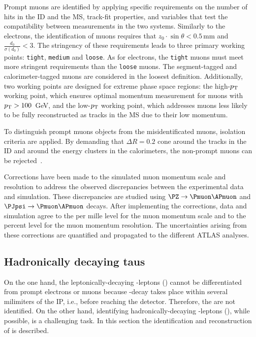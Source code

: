 Prompt muons are identified by applying specific requirements on the number of hits in the ID 
and the MS, track-fit properties, and variables that test the compatibility between measurements 
in the two systems. 
Similarly to the electrons, 
the identification of muons requires that $z_{0} \cdot \sin\theta < 0.5\,$mm and 
$\frac{d_{0}}{\sigma(d_{0})} < 3$. 
The stringency of these requirements leads to three primary working points:
\texttt{tight}, \texttt{medium} and \texttt{loose}. As for electrons, the \texttt{tight} muons must meet 
more stringent requirements than the \texttt{loose} muons. 
The segment-tagged and calorimeter-tagged muons are considered in the loosest definition.
Additionally, two working points are designed for extreme phase space regions: the high-$p_{\text{T}}$ 
working point, which ensures optimal momentum measurement for muons with $p_{\text{T}} > 100$~GeV, 
and the low-$p_{\text{T}}$ working point, which addresses muons less likely to be fully reconstructed as 
tracks in the MS due to their low momentum.

To distinguish prompt muons objects from the misidentificated muons, isolation criteria are applied.
By demanding that $\Delta R=0.2$ cone around the tracks in the ID and around the energy clusters  
in the calorimeters, the non-prompt muons can be rejected~\cite{ATLAS:2020auj}. 

Corrections have been made to the simulated muon momentum scale and resolution to address
the observed discrepancies between the experimental data and simulation.
These discrepancies are studied using $\PZ \rightarrow \Pmuon \APmuon$ 
and $\PJpsi \rightarrow \Pmuon \APmuon$ decays. After implementing the corrections, data and %
simulation agree to the per mille level for the muon momentum scale and to the percent level for the 
muon momentum resolution. The uncertainties arising from these corrections are quantified and propagated to 
the different ATLAS analyses.



\subsection{Hadronically decaying taus}
\label{sec:Chap3:Reco:Tau}
On the one hand, the leptonically-decaying \Ptau-leptons (\taulep) cannot be differentiated from prompt
electrons or muons because \Ptau-decay takes place within several milimiters of the IP, 
i.e., before reaching the detector. Therefore, the \taulep are not identified. 
On the other hand, identifying hadronically-decaying \Ptau-leptons (\tauhad), while possible, is a challenging task. In this
section the identification and reconstruction of \tauhad is described.

